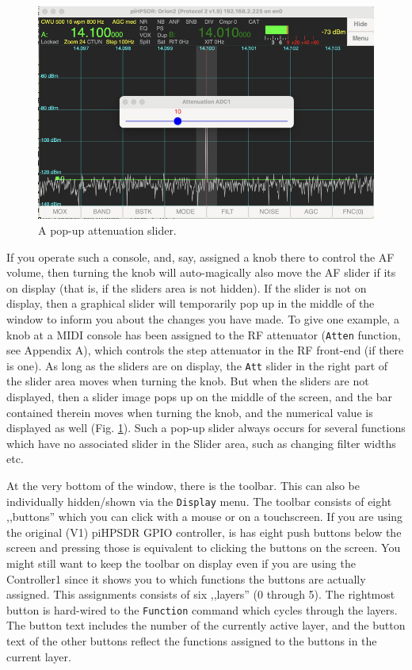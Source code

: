 \documentclass[12pt]{book}
\def\rett#1{\texttt{\color{red}#1}}
\def\bltt#1{\texttt{\color{blue}#1}}
\def\pH{pi\-HPSDR\xspace}
\begin{document}
\begin{figure}
\center
\includegraphics[scale=0.45]{SliderOnScreen.png}
\caption{A pop-up attenuation slider.}
\label{fig:SliderOnScreen}
\end{figure}

If you operate such a console, and, say, assigned
a knob there to control the AF volume, then turning the
knob will auto-magically also move the AF slider if its
on display (that is, if the sliders area is not hidden).
If the slider is not on display,
then a graphical slider will temporarily pop up in the
middle of the window to inform you about the changes
you have  made. To give one example, a knob at a
MIDI console has been assigned to the RF attenuator (\bltt{Atten}
function, see Appendix A), which controls the step
attenuator in the RF front-end (if there is one). As long
as the  sliders  are  on display, the \rett{Att} slider
in the right part of the slider area moves when turning
the knob. But when the sliders are not displayed, then a slider image
pops up  on the middle of the screen, and the
bar contained therein moves when turning the knob,
and the numerical value is displayed as well (Fig. \ref{fig:SliderOnScreen}).
Such a pop-up slider always occurs for several functions which have no
associated slider in the Slider area, such as changing filter widths etc.

At the very bottom of the window, there is the toolbar. This can also be
individually hidden/shown via the \bltt{Display} menu. The toolbar consists
of eight ,,buttons'' which you can click with a mouse or on a touchscreen.
If you are using the original (V1) \pH GPIO controller, is has eight
push buttons below the screen and pressing those is equivalent to clicking
the buttons on the screen. You might still want to keep the toolbar on display
even if you are using the Controller1 since it shows you to which functions
the buttons are actually assigned. This assignments consists of six ,,layers''
(0 through 5). The rightmost button is hard-wired to the \bltt{Function}
command which cycles through the layers. The button text includes the
number of the currently active layer, and the button text of the other buttons
reflect the functions assigned to the buttons in the current layer.
\end{document}
